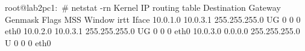 root@lab2pc1:~# netstat -rn
Kernel IP routing table
Destination     Gateway         Genmask         Flags   MSS Window  irtt Iface
10.0.1.0        10.0.3.1        255.255.255.0   UG        0 0          0 eth0
10.0.2.0        10.0.3.1        255.255.255.0   UG        0 0          0 eth0
10.0.3.0        0.0.0.0         255.255.255.0   U         0 0          0 eth0

